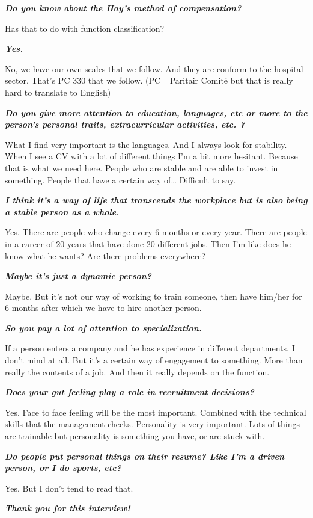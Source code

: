 \documentclass[a4paper,fleqn,11pt,dvips,titlepage]{article}
\newcommand{\question}[1]{\textbf{\textit{#1}}}
\numberwithin{figure}{section}
\numberwithin{equation}{section}
\begin{document}
\question{Do you know about the Hay’s method of compensation?}

Has that to do with function classification?

\question{Yes. }

No, we have our own scales that we follow. And they are conform to the hospital sector. That’s PC 330 that we follow. (PC= Paritair Comité but that is really hard to translate to English) 

\question{Do you give more attention to education, languages, etc or more to the person’s personal traits, extracurricular activities, etc. ?}

What I find very important is the languages. And I always look for stability. When I see a CV with a lot of different things I’m a bit more hesitant. Because that is what we need here. People who are stable and are able to invest in something. People that have a certain way of… Difficult to say. 

\question{I think it’s a way of life that transcends the workplace but is also being a stable person as a whole. }

Yes. There are people who change every 6 months or every year. There are people in a career of 20 years that have done 20 different jobs. Then I’m like does he know what he wants? Are there problems everywhere? 

\question{Maybe it’s just a dynamic person? }

Maybe. But it’s not our way of working to train someone, then have him/her for 6 months after which we have to hire another person. 

\question{So you pay a lot of attention to specialization. }

If a person enters a company and he has experience in different departments, I don’t mind at all. But it’s a certain way of engagement to something. More than really the contents of a job. And then it really depends on the function. 

\question{Does your gut feeling play a role in recruitment decisions? }

Yes. Face to face feeling will be the most important. Combined with the technical skills that the management checks. Personality is very important. Lots of things are trainable but personality is something you have, or are stuck with. 

\question{Do people put personal things on their resume? Like I’m a driven person, or I do sports, etc? }

Yes. But I don’t tend to read that. 

\question{Thank you for this interview!}
\end{document}
